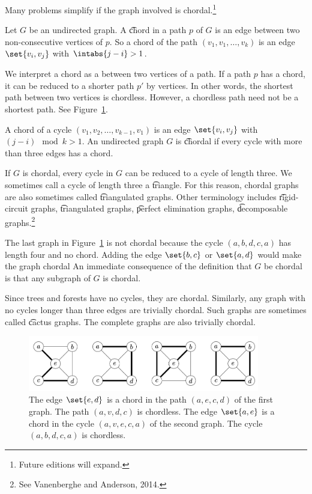 

Many problems simplify if the graph involved is chordal.\footnote{Future editions will expand.}


Let $G$ be an undirected graph.
A \t{chord} in a path $p$ of $G$ is an edge between two non-consecutive vertices of $p$.
So a chord of the path $(v_1, v_1, \dots, v_{k})$ is an edge $\set{v_i, v_j}$ with $\intabs{j - i} > 1$.

We interpret a chord as a  between two vertices of a path.
If a path $p$ has a chord, it can be reduced to a shorter path $p'$ by  vertices.
In other words, the shortest path between two vertices is chordless.
However, a chordless path need not be a shortest path.
See Figure~\ref{figure:chordal_graphs:chords}.


A chord of a cycle $(v_1, v_2, \dots, v_{k-1}, v_1)$ is an edge $\set{v_i, v_j}$ with $(j - i) \mod k > 1$.
An undirected graph $G$ is \t{chordal} if every cycle with more than three edges has a chord.

If $G$ is chordal, every cycle in $G$ can be reduced to a cycle of length three.
We sometimes call a cycle of length three a \t{triangle}.
For this reason, chordal graphs are also sometimes called \t{triangulated graphs}.
Other terminology includes \t{rigid-circuit graphs}, \t{triangulated graphs}, \t{perfect elimination graphs}, \t{decomposable graphs}.\footnote{See Vanenberghe and Anderson, 2014.}

The last graph in Figure~\ref{figure:chordal_graphs:chords} is not chordal because the cycle $(a, b, d, c, a)$ has length four and no chord.
Adding the edge $\set{b, c}$ or $\set{a, d}$ would make the graph chordal
An immediate consequence of the definition that $G$ be chordal is that any subgraph of $G$ is chordal.



Since trees and forests have no cycles, they are chordal.
Similarly, any graph with no cycles longer than three edges are trivially chordal.
Such graphs are sometimes called \t{cactus graphs}.
The complete graphs are also trivially chordal.

\begin{figure}
  \centering
  \includegraphics[width=0.9\textwidth]{graphics_included/chords}
  \caption{
  The edge $\set{e, d}$ is a chord in the path $(a, e, c, d)$ of the first graph. The path $(a, v, d, c)$ is chordless.
  The edge $\set{a, e}$ is a chord in the cycle $(a, v, e, c, a)$ of the second graph.
  The cycle $(a, b, d, c, a)$ is chordless.
  }
  \label{figure:chordal_graphs:chords}
\end{figure}
